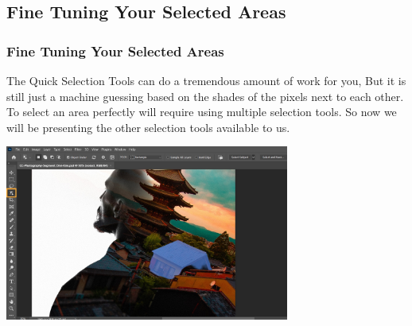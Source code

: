 \documentclass{beamer}
\begin{document}
\subsection{Fine Tuning Your Selected Areas}
\begin{frame}
	\frametitle{Fine Tuning Your Selected Areas}
	\begin{outline}
		\1 The Quick Selection Tools can do a tremendous amount of work for you,
		\2 But it is still just a machine guessing based on the shades of the pixels next to each other.
		\1 To select an area perfectly will require using multiple selection tools.
		\1 So now we will be presenting the other selection tools available to us.
	\end{outline}
	\begin{center}
		\includegraphics[width = 0.7\textwidth]{images/ps-object-selection-on-hover.jpg.img.jpg}
	\end{center}
\end{frame}
\end{document}
